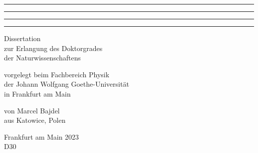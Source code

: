 \begin{titlepage}
\vspace*{1.5cm}
  \begin{center} 
\noindent

	\rule{\textwidth}{1.6pt}\vspace*{-\baselineskip}\vspace*{2pt} %
	\rule{\textwidth}{0.4pt} %
	
	\vspace{0.75\baselineskip} %


	\vspace{0.75\baselineskip} %
	
	\rule{\textwidth}{0.4pt}\vspace*{-\baselineskip}\vspace{3.2pt} %
	\rule{\textwidth}{1.6pt} %
  \end{center}
  
  \vspace*{1.5cm}

  \begin{center} \sffamily\large
    Dissertation\\
    zur Erlangung des Doktorgrades\\
    der Naturwissenschaftens
  \end{center}

  \vspace*{1.5cm}

  \begin{center} \sffamily\large
    vorgelegt beim Fachbereich Physik\\
    der Johann Wolfgang Goethe-Universit\"at\\
    in Frankfurt am Main
  \end{center}

  \vspace*{1.5cm}

  \begin{center} \sffamily\large
    von
    Marcel Bajdel\\
    aus Katowice, Polen
  \end{center}

  \vspace*{1.5cm}

  \begin{center} \sffamily\large
    Frankfurt am Main 2023\\
    D30
  \end{center}

\end{titlepage}
